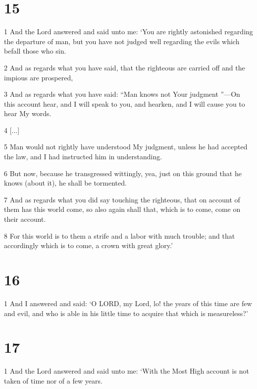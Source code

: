 \chapter{15}

\par 1 And the Lord answered and said unto me: ‘You are rightly astonished regarding the departure of man, but you have not judged well regarding the evils which befall those who sin. 

\par 2 And as regards what you have said, that the righteous are carried off and the impious are prospered, 

\par 3 And as regards what you have said: “Man knows not Your judgment ”—On this account hear, and I will speak to you, and hearken, and I will cause you to hear My words. 

\par 4 [...]

\par 5 Man would not rightly have understood My judgment, unless he had accepted the law, and I had instructed him in understanding. 

\par 6 But now, because he transgressed wittingly, yea, just on this ground that he knows (about it), he shall be tormented.

\par 7 And as regards what you did say touching the righteous, that on account of them has this world come, so also again shall that, which is to come, come on their account. 

\par 8 For this world is to them a strife and a labor with much trouble; and that accordingly which is to come, a crown with great glory.’

\chapter{16}

\par 1 And I answered and said: ‘O LORD, my Lord, lo! the years of this time are few and evil, and who is able in his little time to acquire that which is measureless?’

\chapter{17}

\par 1 And the Lord answered and said unto me: ‘With the Most High account is not taken of time nor of a few years. 

